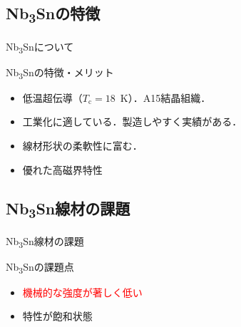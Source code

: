 \documentclass[aspectratio=169, unicode, 10pt]{beamer}
\begin{document}
	\subsection{Nb\textsubscript{3}Snの特徴}
	\begin{frame}{Nb\textsubscript{3}Snについて}
		\begin{block}{Nb\textsubscript{3}Snの特徴・メリット}
			\begin{itemize}
				\item 低温超伝導（$T_\mathrm{c} = 18$~K）．A15結晶組織．
				\item 工業化に適している．製造しやすく実績がある．
				\item 線材形状の柔軟性に富む．
				\item 優れた高磁界特性
			\end{itemize}
		\end{block}
		\vspace{5mm}
		\centering
	\end{frame}

	\subsection{Nb\textsubscript{3}Sn線材の課題}
	\begin{frame}{Nb\textsubscript{3}Sn線材の課題}
		\begin{block}{Nb\textsubscript{3}Snの課題点}
			\begin{itemize}
				\item \textcolor{red}{機械的な強度が著しく低い}
				\item 特性が飽和状態
			\end{itemize}
			\vspace{5mm}
			\centering
		\end{block}
	\end{frame}
\end{document}
